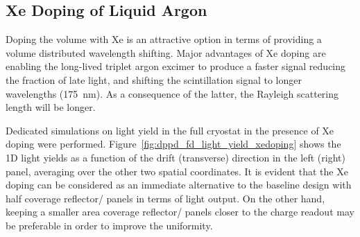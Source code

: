 \subsection{Xe Doping of Liquid Argon}
\label{sec:dp-pds-appendix-xedoping}

Doping the  volume with Xe is an attractive option in terms of providing a volume distributed wavelength shifting. Major advantages of Xe doping are enabling the long-lived triplet argon excimer to produce a faster signal reducing the fraction of late light, and shifting the scintillation signal to longer wavelengths (\SI{175}{nm}). As a consequence of the latter, the Rayleigh scattering length will be longer.

Dedicated simulations on light yield in the full   cryostat in the presence of Xe doping were performed. Figure~\ref{fig:dppd_fd_light_yield_xedoping} shows the 1D light yields as a function of the drift (transverse) direction in the left (right) panel, averaging over the other two spatial coordinates. It is evident that the Xe doping can be considered as an immediate alternative to the baseline design with half coverage reflector/ panels in terms of light output. On the other hand, keeping a smaller area coverage reflector/ panels closer to the charge readout may be preferable in order to improve the uniformity.




